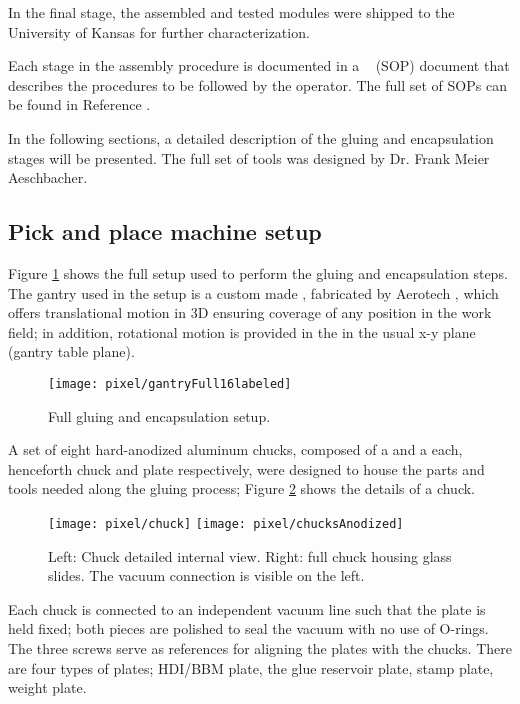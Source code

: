 In the final stage, the assembled and tested modules were shipped to the University of Kansas for further characterization.  

Each stage in the assembly procedure is documented in a ~ (SOP) document that describes the procedures to be followed by the operator. The full set of SOPs can be found in Reference \cite{unl_sop}.     

In the following sections, a detailed description of the gluing and encapsulation stages will be presented. The full set of tools was designed by Dr. Frank Meier Aeschbacher. 

\subsection{Pick and place machine setup}\label{sec:setup}

Figure \ref{fig:setup} shows the full setup used to perform the gluing and encapsulation steps. The gantry used in the setup is a custom made , fabricated by Aerotech \cite{aerotech}, which offers translational motion in 3D ensuring coverage of any position in the work field; in addition, rotational motion is provided in the  in the usual x-y plane (gantry table plane).

\begin{figure}[!h]
  \centering
  \texttt{[image: pixel/gantryFull16labeled]}
  \caption[Full gluing and encapsulation setup]{Full gluing and encapsulation setup. }\label{fig:setup}
\end{figure}

A set of eight hard-anodized aluminum chucks, composed of a  and a  each, henceforth chuck and plate respectively, were designed to house the parts and tools needed along the gluing process; Figure \ref{fig:chuck} shows the details of a chuck.      

\begin{figure}[!h]
  \centering
  \texttt{[image: pixel/chuck]}
  \texttt{[image: pixel/chucksAnodized]}
  \caption[Bare and full chucks]{Left: Chuck detailed internal view. Right: full chuck housing glass slides. The vacuum connection is visible on the left.}\label{fig:chuck}
\end{figure}

Each chuck is connected to an independent vacuum line such that the plate is held fixed; both pieces are polished to seal the vacuum with no use of O-rings. The three screws serve as references for aligning the plates with the chucks. There are four types of plates; HDI/BBM plate, the glue reservoir plate, stamp plate, weight plate.

